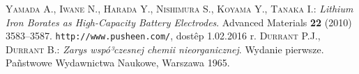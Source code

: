 \begin{thebibliography}{99}
	\thispagestyle{fancy}
	 \textsc{Yamada A., Iwane N., Harada Y., Nishimura S., Koyama Y., Tanaka I.}: \textit{Lithium Iron Borates as High-Capacity Battery Electrodes}. Advanced Materials \textbf{22} (2010) 3583--3587.
	 \texttt{http://www.pusheen.com/}, dostêp 1.02.2016 r.
	 \textsc{Durrant P.J., Durrant B.}: \textit{Zarys wspó³czesnej chemii nieorganicznej}. Wydanie pierwsze. Pañstwowe Wydawnictwa Naukowe, Warszawa 1965.
\end{thebibliography}